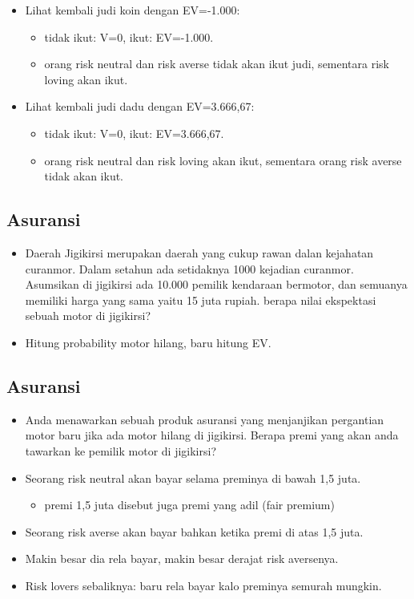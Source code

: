 \documentclass[
  letterpaper,
  DIV=11,
  numbers=noendperiod]{scrartcl}
\providecommand{\tightlist}{%
  \setlength{\itemsep}{0pt}\setlength{\parskip}{0pt}}\usepackage{longtable,booktabs,array}
\begin{document}
\begin{itemize}
\item
  Lihat kembali judi koin dengan EV=-1.000:

  \begin{itemize}
  \item
    tidak ikut: V=0, ikut: EV=-1.000.
  \item
    orang risk neutral dan risk averse tidak akan ikut judi, sementara
    risk loving akan ikut.
  \end{itemize}
\item
  Lihat kembali judi dadu dengan EV=3.666,67:

  \begin{itemize}
  \item
    tidak ikut: V=0, ikut: EV=3.666,67.
  \item
    orang risk neutral dan risk loving akan ikut, sementara orang risk
    averse tidak akan ikut.
  \end{itemize}
\end{itemize}

\subsection{Asuransi}\label{asuransi}

\begin{itemize}
\item
  Daerah Jigikirsi merupakan daerah yang cukup rawan dalan kejahatan
  curanmor. Dalam setahun ada setidaknya 1000 kejadian curanmor.
  Asumsikan di jigikirsi ada 10.000 pemilik kendaraan bermotor, dan
  semuanya memiliki harga yang sama yaitu 15 juta rupiah. berapa nilai
  ekspektasi sebuah motor di jigikirsi?
\item
  Hitung probability motor hilang, baru hitung EV.
\end{itemize}

\subsection{Asuransi}\label{asuransi-1}

\begin{itemize}
\item
  Anda menawarkan sebuah produk asuransi yang menjanjikan pergantian
  motor baru jika ada motor hilang di jigikirsi. Berapa premi yang akan
  anda tawarkan ke pemilik motor di jigikirsi?
\item
  Seorang risk neutral akan bayar selama preminya di bawah 1,5 juta.

  \begin{itemize}
  \tightlist
  \item
    premi 1,5 juta disebut juga premi yang adil (fair premium)
  \end{itemize}
\item
  Seorang risk averse akan bayar bahkan ketika premi di atas 1,5 juta.
\item
  Makin besar dia rela bayar, makin besar derajat risk aversenya.
\item
  Risk lovers sebaliknya: baru rela bayar kalo preminya semurah mungkin.
\end{itemize}
\end{document}
